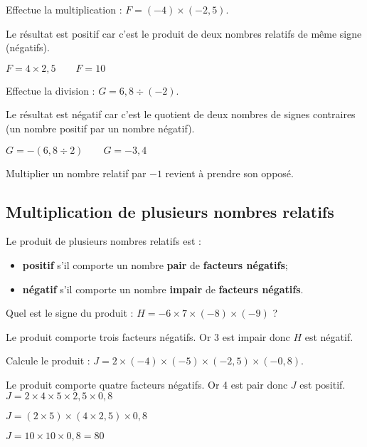 \begin{exemple*1}
Effectue la multiplication : $F = (-4) \times (-2,5)$.

\correction
Le résultat est positif car c'est le produit de deux nombres relatifs de même signe (négatifs).

$F = 4 \times 2,5 \qquad F = 10$
\end{exemple*1}

\begin{exemple*1}
Effectue la division : $G = 6,8 \div (-2)$.

\correction
Le résultat est négatif car c'est le quotient de deux nombres de signes contraires (un nombre positif par un nombre négatif).

$G = -(6,8 \div 2) \qquad		G = -3,4$
\end{exemple*1}

\begin{remarque}
Multiplier un nombre relatif par $-1$ revient à prendre son opposé.
\end{remarque}


\subsection{Multiplication de plusieurs nombres relatifs}

\begin{aconnaitre}
Le produit de plusieurs nombres relatifs est : 
\begin{itemize}
    \item \textbf{positif} s'il comporte un nombre \textbf{pair} de \textbf{facteurs négatifs};
    \item \textbf{négatif} s'il comporte un nombre \textbf{impair} de \textbf{facteurs négatifs}.
\end{itemize}
\end{aconnaitre}

\begin{exemple*1}
Quel est le signe du produit : $H = -6 \times 7 \times (-8) \times (-9)$ ?

\correction
Le produit comporte trois facteurs négatifs. Or 3 est impair donc $H$ est négatif.
\end{exemple*1}


\begin{exemple*1}
Calcule le produit : $J = 2 \times (-4) \times (-5) \times (-2,5) \times (-0,8)$.

\correction
Le produit comporte quatre facteurs négatifs. Or 4 est pair donc $J$ est positif.
$J = 2 \times 4 \times 5 \times 2,5 \times 0,8$

$J = (2 \times 5) \times (4 \times 2,5) \times 0,8$

$J = 10 \times 10 \times 0,8 = 80 $
\end{exemple*1}

